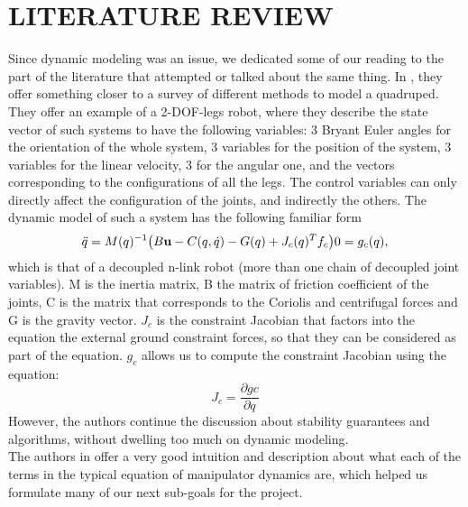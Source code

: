 \section{LITERATURE REVIEW}
Since dynamic modeling was an issue, we dedicated some of our reading to the part of the literature that attempted or talked about the same thing. In \cite{hardt2003dynamic}, they offer something closer to a survey of different methods to model a quadruped. They offer an example of a 2-DOF-legs robot, where they describe the state vector of such systems to have the following variables: 3 Bryant Euler angles for the orientation of the whole system, 3 variables for the position of the system, 3 variables for the linear velocity, 3 for the angular one, and the vectors corresponding to the configurations of all the legs. The control variables can only directly affect the configuration of the joints, and indirectly the others.
The dynamic model of such a system has the following familiar form
$$
\ddot{q} = M(q)^{-1}\big(B\textbf{u} - C(q,\dot{q}) - G(q) + J_c(q)^T f_c\big)
\\
0 = g_c(q),
$$
which is that of a decoupled n-link robot (more than one chain of decoupled joint variables). M is the inertia matrix, B the matrix of friction coefficient of the joints, C is the matrix that corresponds to the Coriolis and centrifugal forces and G is the gravity vector. $J_c$ is the constraint Jacobian that factors into the equation the external ground constraint forces, so that they can be considered as part of the equation. $g_c$ allows us to compute the constraint Jacobian using the equation:
$$
J_c = \frac{\partial gc}{\partial q}
$$
However, the authors continue the discussion about stability guarantees and algorithms, without dwelling too much on dynamic modeling.
\\
The authors in \cite{ferguene2009dynamic} offer a very good intuition and description about what each of the terms in the typical equation of manipulator dynamics are, which helped us formulate many of our next sub-goals for the project.
